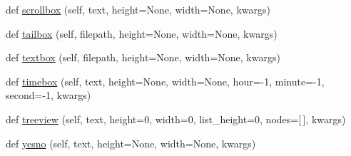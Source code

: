 \begin{DoxyCompactItemize}
\item 
def \hyperlink{class_libraries_1_1dialog_1_1_dialog_afe5fd29978a25b5f905d6104f79cfa6a}{scrollbox} (self, text, height=None, width=None, kwargs)
\item 
def \hyperlink{class_libraries_1_1dialog_1_1_dialog_aea2ac6601829870546730a245756ac94}{tailbox} (self, filepath, height=None, width=None, kwargs)
\item 
def \hyperlink{class_libraries_1_1dialog_1_1_dialog_a4ed3b8b58dac1418c6b672074a8dd33b}{textbox} (self, filepath, height=None, width=None, kwargs)
\item 
def \hyperlink{class_libraries_1_1dialog_1_1_dialog_aa12c79084af6244e3307ee736d0ef721}{timebox} (self, text, height=None, width=None, hour=-\/1, minute=-\/1, second=-\/1, kwargs)
\item 
def \hyperlink{class_libraries_1_1dialog_1_1_dialog_a6ac02e0b9626b5e5ce04898143eb1fb0}{treeview} (self, text, height=0, width=0, list\+\_\+height=0, nodes=\mbox{[}$\,$\mbox{]}, kwargs)
\item 
def \hyperlink{class_libraries_1_1dialog_1_1_dialog_ada50ee8c1d5bdf22ca01cc8d268d0398}{yesno} (self, text, height=None, width=None, kwargs)
\end{DoxyCompactItemize}
